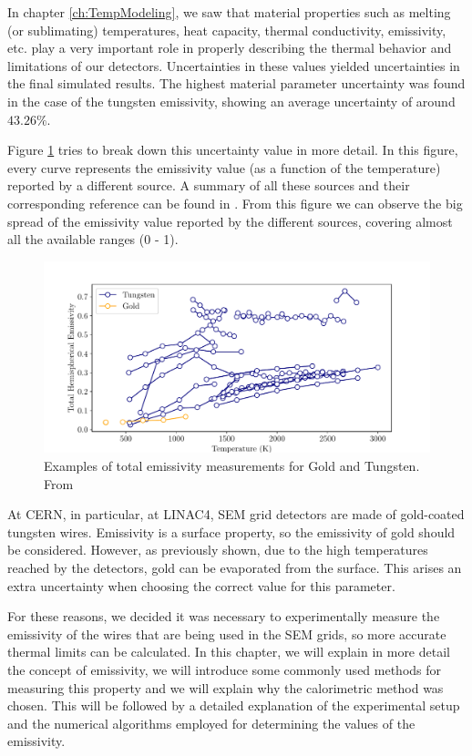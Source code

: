 \pagestyle{fancy}

\graphicspath{ {Figures/Chapter6_EmissivityMeasurement/} }

In chapter \ref{ch:TempModeling}, we saw that material properties such as melting (or sublimating) temperatures, heat capacity, thermal conductivity, emissivity, etc. play a very important role in properly describing the thermal behavior and limitations of our detectors. Uncertainties in these values yielded uncertainties in the final simulated results. The highest material parameter uncertainty was found in the case of the tungsten emissivity, showing an average uncertainty of around $43.26 \%$.

Figure \ref{fig:EmissUnc} tries to break down this uncertainty value in more detail. In this figure, every curve represents the emissivity value (as a function of the temperature) reported by a different source. A summary of all these sources and their corresponding reference can be found in \parencite[]{ref:MatProperties}. From this figure we can observe the big spread of the emissivity value reported by the different sources, covering almost all the available ranges (0 - 1). 

\begin{figure}[h]
    \centering
    \includegraphics[width=0.80\columnwidth]{EmissivityLiteratureVar/EmissivityLit.pdf}
    \caption{Examples of total emissivity measurements for Gold and Tungsten. From \parencite[][]{ref:MatProperties}}
    \label{fig:EmissUnc}
\end{figure}

At CERN, in particular, at LINAC4, SEM grid detectors are made of gold-coated tungsten wires. Emissivity is a surface property, so the emissivity of gold should be considered. However, as previously shown, due to the high temperatures reached by the detectors, gold can be evaporated from the surface. This arises an extra uncertainty when choosing the correct value for this parameter. 

For these reasons, we decided it was necessary to experimentally measure the emissivity of the wires that are being used in the SEM grids, so more accurate thermal limits can be calculated. In this chapter, we will explain in more detail the concept of emissivity, we will introduce some commonly used methods for measuring this property and we will explain why the calorimetric method was chosen. This will be followed by a detailed explanation of the experimental setup and the numerical algorithms employed for determining the values of the emissivity.

